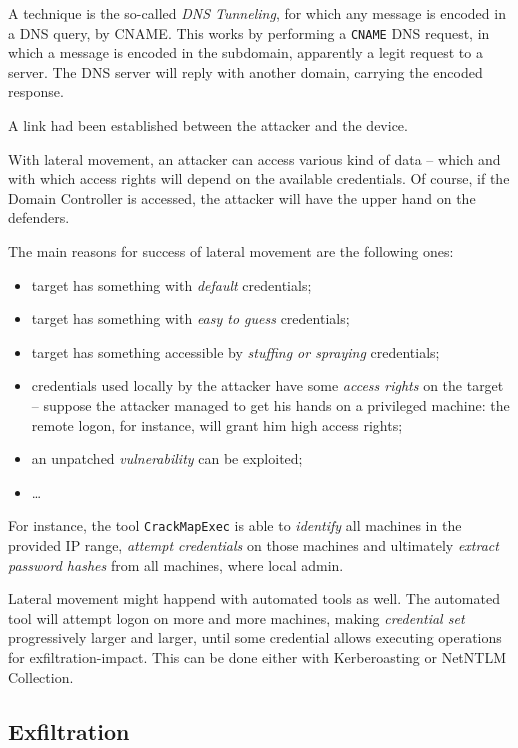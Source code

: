 \documentclass[10pt]{extbook}
\begin{document}
A technique is the so\--called \emph{DNS Tunneling}, for which any message is
encoded in a DNS query, by CNAME. This works by performing a \texttt{CNAME} DNS
request, in which a message is encoded in the subdomain, apparently a legit
request to a server. The DNS server will reply with another domain, carrying
the encoded response.

A link had been established between the
attacker and the device.

With lateral movement, an attacker can access various kind of data -- which and
with which access rights will depend on the available credentials. Of course,
if the Domain Controller is accessed, the attacker will have the upper hand on
the defenders.

The main reasons for success of lateral movement are the following ones:
\begin{itemize}
    \item target has something with \emph{default} credentials;
    \item target has something with \emph{easy to guess} credentials;
    \item target has something accessible by \emph{stuffing or spraying} credentials;
    \item credentials used locally by the attacker have some \emph{access
        rights} on the target -- suppose the attacker managed to get his hands
        on a privileged machine: the remote logon, for instance, will grant him
        high access rights;
    \item an unpatched \emph{vulnerability} can be exploited;
    \item \dots
\end{itemize}

For instance, the tool \texttt{CrackMapExec} is able to \emph{identify} all
machines in the provided IP range, \emph{attempt credentials} on those machines
and ultimately \emph{extract password hashes} from all machines, where local
admin.

Lateral movement might happend with automated tools as well. The automated tool
will attempt logon on more and more machines, making \emph{credential set}
progressively larger and larger, until some credential allows executing
operations for exfiltration\--impact. This can be done either with
Kerberoasting or NetNTLM Collection.


\subsection{Exfiltration}
\end{document}
